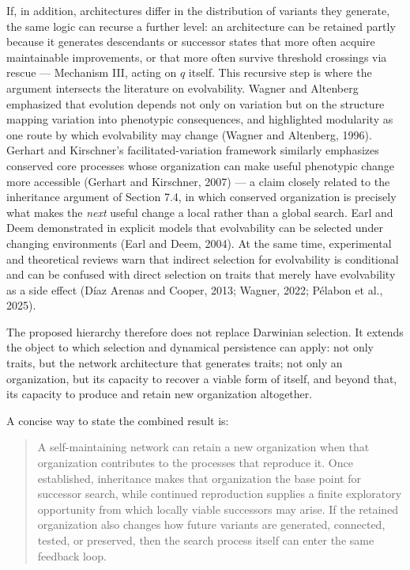 \documentclass[11pt]{article}
\begin{document}
If, in addition, architectures differ in the distribution of variants
they generate, the same logic can recurse a further level: an
architecture can be retained partly because it generates descendants or
successor states that more often acquire maintainable improvements, or
that more often survive threshold crossings via rescue --- Mechanism
III, acting on \(q\) itself. This recursive step is where the argument
intersects the literature on evolvability. Wagner and Altenberg
emphasized that evolution depends not only on variation but on the
structure mapping variation into phenotypic consequences, and
highlighted modularity as one route by which evolvability may change
(Wagner and Altenberg, 1996). Gerhart and Kirschner's
facilitated-variation framework similarly emphasizes conserved core
processes whose organization can make useful phenotypic change more
accessible (Gerhart and Kirschner, 2007) --- a claim closely related to
the inheritance argument of Section 7.4, in which conserved organization
is precisely what makes the \emph{next} useful change a local rather
than a global search. Earl and Deem demonstrated in explicit models that
evolvability can be selected under changing environments (Earl and Deem,
2004). At the same time, experimental and theoretical reviews warn that
indirect selection for evolvability is conditional and can be confused
with direct selection on traits that merely have evolvability as a side
effect (Díaz Arenas and Cooper, 2013; Wagner, 2022; Pélabon et al.,
2025).

The proposed hierarchy therefore does not replace Darwinian selection.
It extends the object to which selection and dynamical persistence can
apply: not only traits, but the network architecture that generates
traits; not only an organization, but its capacity to recover a viable
form of itself, and beyond that, its capacity to produce and retain new
organization altogether.

A concise way to state the combined result is:

\begin{quote}
A self-maintaining network can retain a new organization when that
organization contributes to the processes that reproduce it. Once
established, inheritance makes that organization the base point for
successor search, while continued reproduction supplies a finite
exploratory opportunity from which locally viable successors may arise.
If the retained organization also changes how future variants are
generated, connected, tested, or preserved, then the search process
itself can enter the same feedback loop.
\end{quote}
\end{document}
